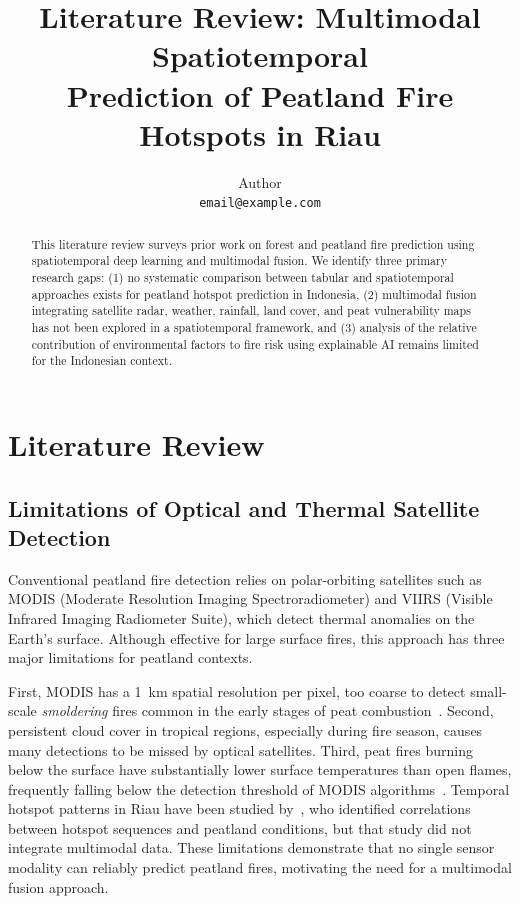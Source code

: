 \documentclass{article}
\title{Literature Review: Multimodal Spatiotemporal\\Prediction of Peatland Fire Hotspots in Riau}
\author{
Author \\
\texttt{email@example.com}
}
\begin{document}
\maketitle

\begin{abstract}
This literature review surveys prior work on forest and peatland fire
prediction using spatiotemporal deep learning and multimodal fusion. We
identify three primary research gaps: (1) no systematic comparison between
tabular and spatiotemporal approaches exists for peatland hotspot prediction
in Indonesia, (2) multimodal fusion integrating satellite radar, weather,
rainfall, land cover, and peat vulnerability maps has not been explored in a
spatiotemporal framework, and (3) analysis of the relative contribution of
environmental factors to fire risk using explainable AI remains limited for
the Indonesian context.
\end{abstract}

\section{Literature Review}

\subsection{Limitations of Optical and Thermal Satellite Detection}

Conventional peatland fire detection relies on polar-orbiting satellites
such as MODIS (Moderate Resolution Imaging Spectroradiometer) and VIIRS
(Visible Infrared Imaging Radiometer Suite), which detect thermal anomalies
on the Earth's surface. Although effective for large surface fires, this
approach has three major limitations for peatland contexts.

First, MODIS has a 1~km spatial resolution per pixel, too coarse to detect
small-scale \emph{smoldering} fires common in the early stages of peat
combustion~\cite{vanwees2022}. Second, persistent cloud cover in tropical
regions, especially during fire season, causes many detections to be missed
by optical satellites. Third, peat fires burning below the surface have
substantially lower surface temperatures than open flames, frequently falling
below the detection threshold of MODIS algorithms~\cite{whitburn2016}.
Temporal hotspot patterns in Riau have been studied by~\cite{sitanggang2018},
who identified correlations between hotspot sequences and peatland conditions,
but that study did not integrate multimodal data. These limitations
demonstrate that no single sensor modality can reliably predict peatland
fires, motivating the need for a multimodal fusion approach.
\end{document}
